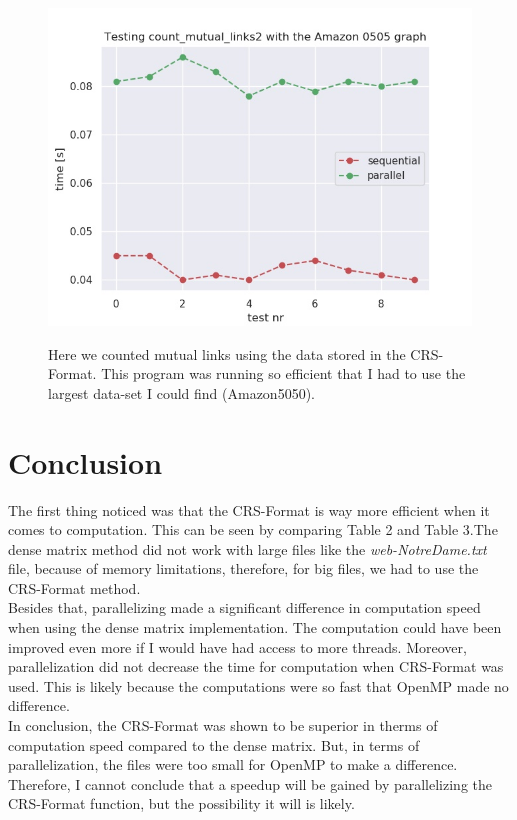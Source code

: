 \documentclass{article}
\begin{document}
\begin{figure}[H]
\centering
\parbox{15cm}{
\includegraphics[width=15cm]{count_2_Amazon_graph.jpg}
\label{fig:Test 1}}
\qquad
\caption{Here we counted mutual links using the data stored in the CRS-Format. This program was running so efficient that I had to use the largest data-set I could find (Amazon5050).}
\end{figure}

\section{Conclusion}

The first thing noticed was that the CRS-Format is way more efficient when it comes to computation. This can be seen by comparing Table 2 and Table 3.The dense matrix method did not work with large files like the \textit{web-NotreDame.txt} file, because of memory limitations, therefore, for big files, we had to use the CRS-Format method. \\
Besides that, parallelizing made a significant difference in computation speed when using the dense matrix implementation. The computation could have been improved even more if I would have had access to more threads. Moreover, parallelization did not decrease the time for computation when CRS-Format was used. This is likely because the computations were so fast that OpenMP made no difference.\\
In conclusion, the CRS-Format was shown to be superior in therms of computation speed compared to the dense matrix. But, in terms of parallelization, the files were too small for OpenMP to make a difference. Therefore, I cannot conclude that a speedup will be gained by parallelizing the CRS-Format function, but the possibility it will is likely.



\end{document}
